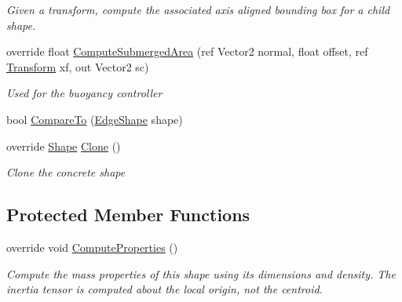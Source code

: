 \begin{DoxyCompactItemize}
\begin{DoxyCompactList}\small\item\em Given a transform, compute the associated axis aligned bounding box for a child shape. \end{DoxyCompactList}\item 
override float \hyperlink{class_farseer_physics_1_1_collision_1_1_shapes_1_1_edge_shape_ac007eca3a63bf077ebbf5b434b680693}{Compute\+Submerged\+Area} (ref Vector2 normal, float offset, ref \hyperlink{struct_farseer_physics_1_1_common_1_1_transform}{Transform} xf, out Vector2 sc)
\begin{DoxyCompactList}\small\item\em Used for the buoyancy controller \end{DoxyCompactList}\item 
bool \hyperlink{class_farseer_physics_1_1_collision_1_1_shapes_1_1_edge_shape_a24321ac181c5967cf269303c1b7e7e57}{Compare\+To} (\hyperlink{class_farseer_physics_1_1_collision_1_1_shapes_1_1_edge_shape}{Edge\+Shape} shape)
\item 
override \hyperlink{class_farseer_physics_1_1_collision_1_1_shapes_1_1_shape}{Shape} \hyperlink{class_farseer_physics_1_1_collision_1_1_shapes_1_1_edge_shape_acc933e13314f290d6ecdb748d8a58021}{Clone} ()
\begin{DoxyCompactList}\small\item\em Clone the concrete shape \end{DoxyCompactList}\end{DoxyCompactItemize}
\subsection*{Protected Member Functions}
\begin{DoxyCompactItemize}
\item 
override void \hyperlink{class_farseer_physics_1_1_collision_1_1_shapes_1_1_edge_shape_a02b5fcd09cd67c7109a816ede347c0de}{Compute\+Properties} ()
\begin{DoxyCompactList}\small\item\em Compute the mass properties of this shape using its dimensions and density. The inertia tensor is computed about the local origin, not the centroid. \end{DoxyCompactList}\end{DoxyCompactItemize}
